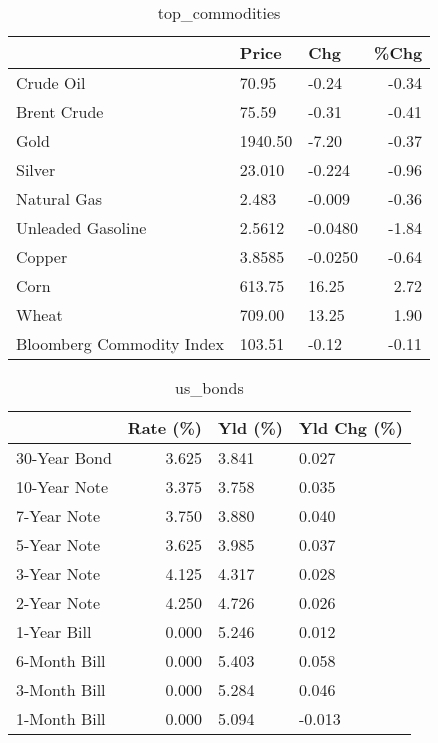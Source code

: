\documentclass{article}%
\begin{document}
\begin{table}[htbp]%
\caption{top\_commodities}%
\centering%
\begin{adjustbox}{width=1\textwidth}%
\begin{tabular}{lllr}
\toprule
                          &   Price &     Chg &  \%Chg \\
\midrule
               Crude Oil  &   70.95 &   -0.24 & -0.34 \\
             Brent Crude  &   75.59 &   -0.31 & -0.41 \\
                    Gold  & 1940.50 &   -7.20 & -0.37 \\
                  Silver  &  23.010 &  -0.224 & -0.96 \\
             Natural Gas  &   2.483 &  -0.009 & -0.36 \\
       Unleaded Gasoline  &  2.5612 & -0.0480 & -1.84 \\
                  Copper  &  3.8585 & -0.0250 & -0.64 \\
                    Corn  &  613.75 &   16.25 &  2.72 \\
                   Wheat  &  709.00 &   13.25 &  1.90 \\
Bloomberg Commodity Index &  103.51 &   -0.12 & -0.11 \\
\bottomrule
\end{tabular}
%
\end{adjustbox}%
\end{table}

%


\begin{table}[htbp]%
\caption{us\_bonds}%
\centering%
\begin{adjustbox}{width=1\textwidth}%
\begin{tabular}{lrll}
\toprule
             &  Rate (\%) & Yld (\%) & Yld Chg (\%) \\
\midrule
30-Year Bond &     3.625 &   3.841 &       0.027 \\
10-Year Note &     3.375 &   3.758 &       0.035 \\
 7-Year Note &     3.750 &   3.880 &       0.040 \\
 5-Year Note &     3.625 &   3.985 &       0.037 \\
 3-Year Note &     4.125 &   4.317 &       0.028 \\
 2-Year Note &     4.250 &   4.726 &       0.026 \\
 1-Year Bill &     0.000 &   5.246 &       0.012 \\
6-Month Bill &     0.000 &   5.403 &       0.058 \\
3-Month Bill &     0.000 &   5.284 &       0.046 \\
1-Month Bill &     0.000 &   5.094 &      -0.013 \\
\bottomrule
\end{tabular}
%
\end{adjustbox}%
\end{table}
\end{document}
